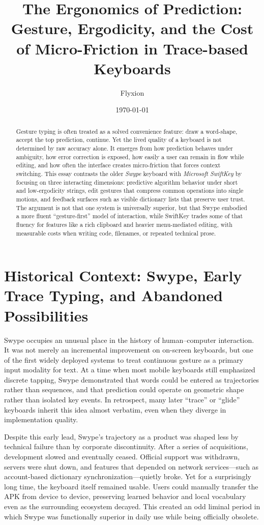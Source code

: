 \documentclass[11pt]{article}
\title{The Ergonomics of Prediction: Gesture, Ergodicity, and the Cost of Micro-Friction in Trace-based Keyboards}
\author{Flyxion}
\date{\today}
\begin{document}
\maketitle

\begin{abstract}
Gesture typing is often treated as a solved convenience feature: draw a word-shape, accept the top prediction, continue. Yet the lived quality of a keyboard is not determined by raw accuracy alone. It emerges from how prediction behaves under ambiguity, how error correction is exposed, how easily a user can remain in flow while editing, and how often the interface creates micro-friction that forces context switching. This essay contrasts the older \textit{Swype} keyboard with \textit{Microsoft SwiftKey} by focusing on three interacting dimensions: predictive algorithm behavior under short and low-ergodicity strings, edit gestures that compress common operations into single motions, and feedback surfaces such as visible dictionary lists that preserve user trust. The argument is not that one system is universally superior, but that Swype embodied a more fluent ``gesture-first'' model of interaction, while SwiftKey trades some of that fluency for features like a rich clipboard and heavier menu-mediated editing, with measurable costs when writing code, filenames, or repeated technical prose.
\end{abstract}

\newpage
\section{Historical Context: Swype, Early Trace Typing, and Abandoned Possibilities}

Swype occupies an unusual place in the history of human--computer interaction. It was not merely an incremental improvement on on-screen keyboards, but one of the first widely deployed systems to treat continuous gesture as a primary input modality for text. At a time when most mobile keyboards still emphasized discrete tapping, Swype demonstrated that words could be entered as trajectories rather than sequences, and that prediction could operate on geometric shape rather than isolated key events. In retrospect, many later ``trace'' or ``glide'' keyboards inherit this idea almost verbatim, even when they diverge in implementation quality.

Despite this early lead, Swype’s trajectory as a product was shaped less by technical failure than by corporate discontinuity. After a series of acquisitions, development slowed and eventually ceased. Official support was withdrawn, servers were shut down, and features that depended on network services—such as account-based dictionary synchronization—quietly broke. Yet for a surprisingly long time, the keyboard itself remained usable. Users could manually transfer the APK from device to device, preserving learned behavior and local vocabulary even as the surrounding ecosystem decayed. This created an odd liminal period in which Swype was functionally superior in daily use while being officially obsolete.
\end{document}
